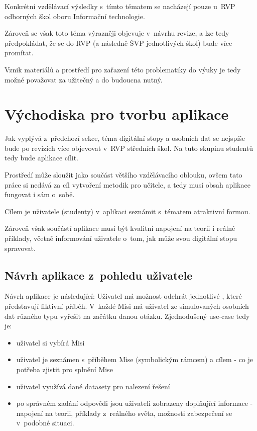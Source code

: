 Konkrétní vzdělávací výsledky s~tímto tématem se nacházejí pouze u~RVP odborných škol oboru Informační technologie.

Zároveň se však toto téma výrazněji objevuje v~návrhu revize, a lze tedy předpokládat, že se do RVP (a následně ŠVP jednotlivých škol) bude více promítat.

Vznik materiálů a prostředí pro zařazení této problematiky do výuky je tedy možné považovat za užitečný a do budoucna nutný.



\section{Východiska pro tvorbu aplikace}
Jak vyplývá z~předchozí sekce, téma digitální stopy a osobních dat se nejspíše bude po revizích více objevovat v~RVP středních škol. Na tuto skupinu studentů tedy bude aplikace cílit.

Prostředí může sloužit jako součást většího vzdělávacího oblouku, ovšem tato práce si nedává za cíl vytvoření metodik pro učitele, a tedy musí obsah aplikace fungovat i sám o~sobě.

Cílem je uživatele (studenty) v~aplikaci seznámit s~tématem atraktivní formou.

Zároveň však součástí aplikace musí být kvalitní napojení na teorii i reálné příklady, včetně informování uživatele o~tom, jak může svou digitální stopu spravovat.

\subsection{Návrh aplikace z~pohledu uživatele}
Návrh aplikace je následující:
Uživatel má možnost odehrát jednotlivé , které představují fiktivní příběh. V~každé Misi má uživatel ze simulovaných osobních dat různého typu vyřešit na začátku danou otázku.
Zjednodušený use-case tedy je:
\begin{itemize}
	\item uživatel si vybírá Misi
	\item uživatel je seznámen s~příběhem Mise (symbolickým rámcem) a cílem - co je potřeba zjistit pro splnění Mise
	\item uživatel využívá dané datasety pro nalezení řešení
	\item po správném zadání odpovědi jsou uživateli zobrazeny doplňující informace - napojení na teorii, příklady z~reálného světa, možnosti zabezpečení se v~podobné situaci.
\end{itemize}

